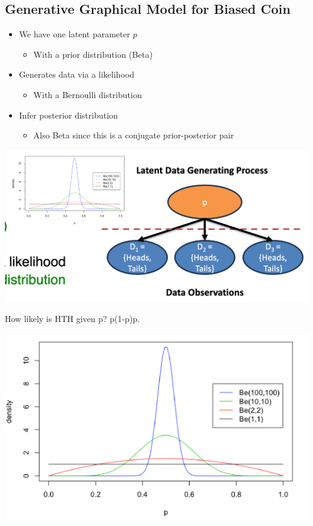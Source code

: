 \documentclass[11pt]{article}
\theoremstyle{definition}
\begin{document}
\subsection{Generative Graphical Model for Biased Coin}

\begin{itemize}
    \item We have one latent parameter \( p \)
    \begin{itemize}
        \item With a prior distribution (Beta)
    \end{itemize}
    \item Generates data via a likelihood
    \begin{itemize}
        \item With a Bernoulli distribution
    \end{itemize}
    \item Infer posterior distribution
    \begin{itemize}
        \item Also Beta since this is a conjugate prior-posterior pair
    \end{itemize}
\end{itemize}

\includegraphics[width=\textwidth/2]{9.png}

How likely is HTH given p? p(1-p)p.

\includegraphics[width=\textwidth/2]{5.png}
\end{document}
